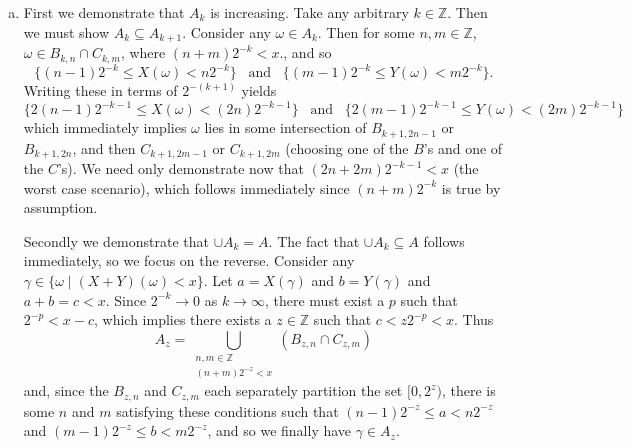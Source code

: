 \documentclass{article}
\begin{document}
\begin{enumerate}[(a)]

\item First we demonstrate that $A_k$ is increasing. Take any arbitrary $k \in \mathbb{Z}$. Then we must show $A_k \subseteq A_{k + 1}$. Consider any $\omega \in A_k$. Then for some $n,m \in \mathbb{Z}$, $\omega \in B_{k,n} \cap C_{k,m}$, where $(n + m)2^{-k} < x$., and so \[\{(n-1) 2^{-k} \leq X(\omega) < n 2^{-k}\} \;\;\; \text{and} \;\;\; \{(m-1) 2^{-k} \leq Y(\omega) < m 2^{-k}\}.\] Writing these in terms of $2^{-(k + 1)}$ yields \[\{2(n-1) 2^{-k-1} \leq X(\omega) < (2n) 2^{-k-1}\} \;\;\; \text{and} \;\;\; \{2(m-1) 2^{-k-1} \leq Y(\omega) < (2m) 2^{-k-1}\}\] which immediately implies $\omega$ lies in some intersection of $B_{k+1,2n-1}$ or $B_{k+1,2n}$, and then $C_{k+1,2m-1}$ or $C_{k+1,2m}$ (choosing one of the $B$'s and one of the $C$'s). We need only demonstrate now that $(2n + 2m) 2^{-k - 1} < x$ (the worst case scenario), which follows immediately since $(n + m) 2^{-k}$ is true by assumption. 

Secondly we demonstrate that $\cup A_k = A$. The fact that $\cup A_k \subseteq A$ follows immediately, so we focus on the reverse. Consider any $\gamma \in \{\omega \mid (X+Y)(\omega) < x\}$. Let $a = X(\gamma)$ and $b = Y(\gamma)$ and  $a + b = c < x$. Since $2^{-k} \to 0$ as $k \to \infty$, there must exist a $p$ such that $2^{-p} < x - c$, which implies there exists a $z \in \mathbb{Z}$ such that $c < z 2^{-p} < x$. Thus \[A_z = \bigcup_{\substack{n,m \in \mathbb{Z} \\ (n+m)2^{-z} < x}} (B_{z,n} \cap C_{z,m})\] and, since the $B_{z,n}$ and $C_{z,m}$ each separately partition the set $[0, 2^{z})$, there is some $n$ and $m$ satisfying these conditions such that $(n-1)2^{-z} \leq a < n 2^{-z}$ and $(m-1)2^{-z} \leq b < m 2^{-z}$, and so we finally have $\gamma \in A_z$. 



\end{enumerate}
\end{document}
